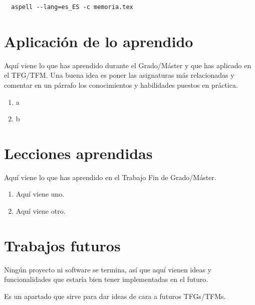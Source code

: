 \documentclass[a4paper, 12pt]{book}
\begin{document}
\begin{verbatim}
  aspell --lang=es_ES -c memoria.tex
\end{verbatim}

\section{Aplicación de lo aprendido}
\label{sec:aplicacion}

Aquí viene lo que has aprendido durante el Grado/Máster y que has aplicado en el TFG/TFM. Una buena idea es poner las asignaturas más relacionadas y comentar en un párrafo los conocimientos y habilidades puestos en práctica.

\begin{enumerate}
  \item a
  \item b
\end{enumerate}


\section{Lecciones aprendidas}
\label{sec:lecciones_aprendidas}

Aquí viene lo que has aprendido en el Trabajo Fin de Grado/Máster.

\begin{enumerate}
  \item Aquí viene uno.
  \item Aquí viene otro.
\end{enumerate}


\section{Trabajos futuros}
\label{sec:trabajos_futuros}

Ningún proyecto ni software se termina, así que aquí vienen ideas y funcionalidades que estaría bien tener implementadas en el futuro.

Es un apartado que sirve para dar ideas de cara a futuros TFGs/TFMs.



\printglossary[type=\acronymtype]

\printglossary
\end{document}
